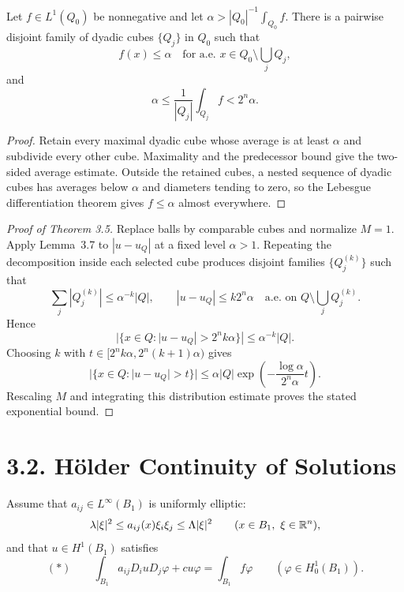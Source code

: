 \begin{lemma}\label{hanlin:weaksol-part1-cz}
Let $f\in L^1(Q_0)$ be nonnegative and let
$\alpha>|Q_0|^{-1}\int_{Q_0}f$. There is a pairwise disjoint family of
dyadic cubes $\{Q_j\}$ in $Q_0$ such that
\[
f(x)\leq\alpha\quad\text{for a.e. }x\in Q_0\setminus\bigcup_jQ_j,
\]
and
\[
\alpha\leq\frac1{|Q_j|}\int_{Q_j}f<2^n\alpha.
\]
\end{lemma}
\begin{proof}
\sketch Retain every maximal dyadic cube whose average is at least $\alpha$
and subdivide every other cube. Maximality and the predecessor bound give the
two-sided average estimate. Outside the retained cubes, a nested sequence of
dyadic cubes has averages below $\alpha$ and diameters tending to zero, so the
Lebesgue differentiation theorem gives $f\leq\alpha$ almost everywhere.
\end{proof}

\begin{proof}[Proof of Theorem 3.5]
\sketch Replace balls by comparable cubes and normalize $M=1$. Apply
Lemma~3.7 to $|u-u_Q|$ at a fixed level $\alpha>1$. Repeating the
decomposition inside each selected cube produces disjoint families
$\{Q_j^{(k)}\}$ such that
\[
\sum_j|Q_j^{(k)}|\leq\alpha^{-k}|Q|,
\qquad
|u-u_Q|\leq k2^n\alpha
\quad\text{a.e. on }Q\setminus\bigcup_jQ_j^{(k)}.
\]
Hence
\[
|\{x\in Q:|u-u_Q|>2^nk\alpha\}|
\leq\alpha^{-k}|Q|.
\]
Choosing $k$ with
$t\in[2^nk\alpha,2^n(k+1)\alpha)$ gives
\[
|\{x\in Q:|u-u_Q|>t\}|
\leq\alpha|Q|\exp\left(-\frac{\log\alpha}{2^n\alpha}t\right).
\]
Rescaling $M$ and integrating this distribution estimate proves the stated
exponential bound.
\end{proof}

\section*{3.2. H\"older Continuity of Solutions}

Assume that $a_{ij}\in L^\infty(B_1)$ is uniformly elliptic:
\[
\lambda|\xi|^2\leq a_{ij}(x)\xi_i\xi_j\leq\Lambda|\xi|^2
\qquad(x\in B_1,\ \xi\in\mathbb{R}^n),
\]
and that $u\in H^1(B_1)$ satisfies
\[
(\ast)\qquad
\int_{B_1}a_{ij}D_i uD_j\varphi+cu\varphi
=\int_{B_1}f\varphi
\qquad(\varphi\in H^1_0(B_1)).
\]

